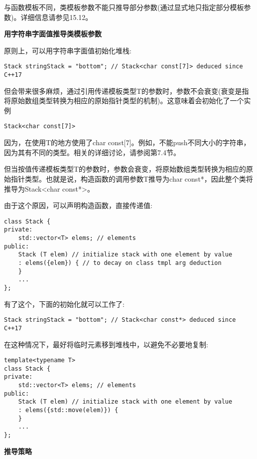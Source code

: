 与函数模板不同，类模板参数不能只推导部分参数(通过显式地只指定部分模板参数)。详细信息请参见15.12。

\noindent
\textbf{用字符串字面值推导类模板参数}

原则上，可以用字符串字面值初始化堆栈:

\begin{lstlisting}[style=styleCXX]
Stack stringStack = "bottom"; // Stack<char const[7]> deduced since C++17
\end{lstlisting}

但会带来很多麻烦，通过引用传递模板类型T的参数时，参数不会衰变(衰变是指将原始数组类型转换为相应的原始指针类型的机制)。这意味着会初始化了一个实例

\begin{lstlisting}[style=styleCXX]
Stack<char const[7]>
\end{lstlisting}

因为，在使用T的地方使用了char const[7]。例如，不能push不同大小的字符串，因为其有不同的类型。相关的详细讨论，请参阅第7.4节。

但当按值传递模板类型T的参数时，参数会衰变，将原始数组类型转换为相应的原始指针类型。也就是说，构造函数的调用参数T推导为char const*，因此整个类将推导为Stack<char const*>。

由于这个原因，可以声明构造函数，直接传递值:

\begin{lstlisting}[style=styleCXX]
class Stack {
private:
	std::vector<T> elems; // elements
public:
	Stack (T elem) // initialize stack with one element by value
	: elems({elem}) { // to decay on class tmpl arg deduction
	}
	...
};
\end{lstlisting}

有了这个，下面的初始化就可以工作了:

\begin{lstlisting}[style=styleCXX]
Stack stringStack = "bottom"; // Stack<char const*> deduced since C++17
\end{lstlisting}

在这种情况下，最好将临时元素移到堆栈中，以避免不必要地复制:

\begin{lstlisting}[style=styleCXX]
template<typename T>
class Stack {
private:
	std::vector<T> elems; // elements
public:
	Stack (T elem) // initialize stack with one element by value
	: elems({std::move(elem)}) {
	}
	...
};
\end{lstlisting}

\noindent
\textbf{推导策略}


